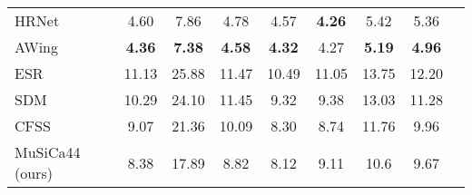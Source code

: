\documentclass[twocolumn]{article}
\begin{document}
\begin{table*}[]
\begin{tabular}{@{}lcccccccl@{}}
HRNet  \cite{sun2019high}       & 4.60                        & 7.86                                                  & 4.78                                                        & 4.57                                                          & \textbf{4.26}                                            & 5.42                                                       & 5.36                                                  & \cellcolor[HTML]{FE0000}                        \\
AWing  \cite{wang2019adaptive}       & \textbf{4.36}               & \textbf{7.38}                                         & \textbf{4.58}                                               & \textbf{4.32}                                                 & 4.27                                                     & \textbf{5.19}                                              & \textbf{4.96}                                         & \cellcolor[HTML]{FE0000}{\color[HTML]{000000} } \\ \midrule
ESR \cite{cao2014face}          & 11.13                       & 25.88                                                 & 11.47                                                       & 10.49                                                         & 11.05                                                    & 13.75                                                      & 12.20                                                 & \cellcolor[HTML]{0000FF}                        \\
SDM \cite{xiong2013supervised}  & 10.29                       & 24.10                                                 & 11.45                                                       & 9.32                                                          & 9.38                                                     & 13.03                                                      & 11.28                                                 & \cellcolor[HTML]{0000FF}                        \\
CFSS \cite{cao2014face} & 9.07                        & 21.36                                                 & 10.09                                                       & 8.30                                                          & 8.74                                                     & 11.76                                                      & 9.96                                                  & \cellcolor[HTML]{0000FF}                        \\
MuSiCa44 (ours)     & 8.38                        & 17.89                                                 & 8.82                                                        & 8.12                                                          & 9.11                                                     & 10.6                                                       & 9.67                                                  & \cellcolor[HTML]{0000FF}                        \\

\end{tabular}
\end{table*}
\end{document}
